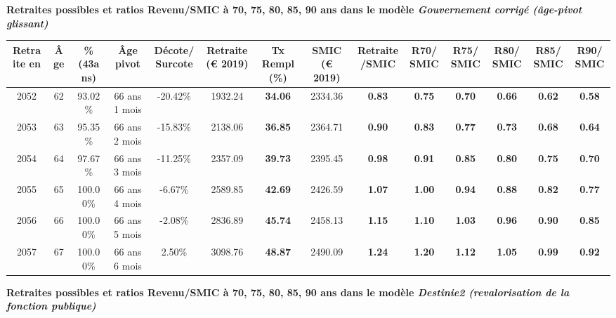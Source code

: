  \vspace{0.1cm} 
{\bf \noindent Retraites possibles et ratios Revenu/SMIC à 70, 75, 80, 85, 90 ans dans le modèle \emph{Gouvernement corrigé (âge-pivot glissant)}}  
 
\begin{adjustbox}{max width=\textwidth} 
\begin{tabular}[htb]{|c|c||c|c|c||c|c||c|c||c|c|c|c|c|} 
\hline 
 Retraite en &  Âge &  \%(43ans) &  Âge pivot &  Décote/Surcote &  Retraite (\euro{} 2019) &  Tx Rempl(\%) &  SMIC (\euro{} 2019) &  Retraite/SMIC &  R70/SMIC &  R75/SMIC &  R80/SMIC &  R85/SMIC &  R90/SMIC \\ 
\hline \hline 
 2052 &  62 &  93.02\% &  66 ans 1 mois &  -20.42\% &  1932.24 &  {\bf 34.06} &  2334.36 &  {\bf {\color{red} 0.83}} &  {\bf {\color{red} 0.75}} &  {\bf {\color{red} 0.70}} &  {\bf {\color{red} 0.66}} &  {\bf {\color{red} 0.62}} &  {\bf {\color{red} 0.58}} \\ 
\hline 
 2053 &  63 &  95.35\% &  66 ans 2 mois &  -15.83\% &  2138.06 &  {\bf 36.85} &  2364.71 &  {\bf {\color{red} 0.90}} &  {\bf {\color{red} 0.83}} &  {\bf {\color{red} 0.77}} &  {\bf {\color{red} 0.73}} &  {\bf {\color{red} 0.68}} &  {\bf {\color{red} 0.64}} \\ 
\hline 
 2054 &  64 &  97.67\% &  66 ans 3 mois &  -11.25\% &  2357.09 &  {\bf 39.73} &  2395.45 &  {\bf {\color{red} 0.98}} &  {\bf {\color{red} 0.91}} &  {\bf {\color{red} 0.85}} &  {\bf {\color{red} 0.80}} &  {\bf {\color{red} 0.75}} &  {\bf {\color{red} 0.70}} \\ 
\hline 
 2055 &  65 &  100.00\% &  66 ans 4 mois &  -6.67\% &  2589.85 &  {\bf 42.69} &  2426.59 &  {\bf 1.07} &  {\bf 1.00} &  {\bf {\color{red} 0.94}} &  {\bf {\color{red} 0.88}} &  {\bf {\color{red} 0.82}} &  {\bf {\color{red} 0.77}} \\ 
\hline 
 2056 &  66 &  100.00\% &  66 ans 5 mois &  -2.08\% &  2836.89 &  {\bf 45.74} &  2458.13 &  {\bf 1.15} &  {\bf 1.10} &  {\bf 1.03} &  {\bf {\color{red} 0.96}} &  {\bf {\color{red} 0.90}} &  {\bf {\color{red} 0.85}} \\ 
\hline 
 2057 &  67 &  100.00\% &  66 ans 6 mois &  2.50\% &  3098.76 &  {\bf 48.87} &  2490.09 &  {\bf 1.24} &  {\bf 1.20} &  {\bf 1.12} &  {\bf 1.05} &  {\bf {\color{red} 0.99}} &  {\bf {\color{red} 0.92}} \\ 
\hline 
\hline 
\end{tabular} 
\end{adjustbox} 
 
 \vspace{0.1cm} 
{\bf \noindent Retraites possibles et ratios Revenu/SMIC à 70, 75, 80, 85, 90 ans dans le modèle \emph{Destinie2 (revalorisation de la fonction publique)}}  
 
